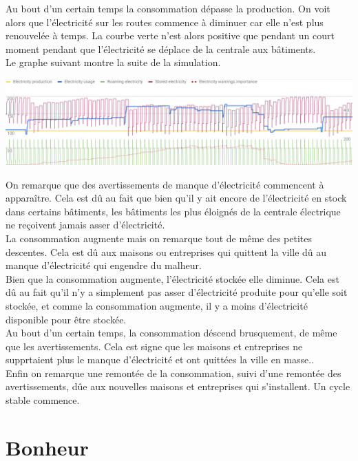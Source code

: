 \documentclass[11pt]{report}
\begin{document}
Au bout d'un certain temps la consommation dépasse la production. On voit alors que l'électricité sur les routes commence à diminuer car elle n'est plus renouvelée à temps. La courbe verte n'est alors positive que pendant un court moment pendant que l'électricité se déplace de la centrale aux bâtiments.\\
Le graphe suivant montre la suite de la simulation.
\begin{center}
	\includegraphics[width=\textwidth]{electricity_storage_2}
\end{center}
On remarque que des avertissements de manque d'électricité commencent à apparaître. Cela est dû au fait que bien qu'il y ait encore de l'électricité en stock dans certains bâtiments, les bâtiments les plus éloignés de la centrale électrique ne reçoivent jamais asser d'électricité.\\
La consommation augmente mais on remarque tout de même des petites descentes. Cela est dû aux maisons ou entreprises qui quittent la ville dû au manque d'électricité qui engendre du malheur.\\
Bien que la consommation augmente, l'électricité stockée elle diminue. Cela est dû au fait qu'il n'y a simplement pas asser d'électricité produite pour qu'elle soit stockée, et comme la consommation augmente, il y a moins d'électricité disponible pour être stockée.\\
Au bout d'un certain temps, la consommation déscend brusquement, de même que les avertissements. Cela est signe que les maisons et entreprises ne supprtaient plus le manque d'électricité et ont quittées la ville en masse..\\
Enfin on remarque une remontée de la consommation, suivi d'une remontée des avertissements, dûe aux nouvelles maisons et entreprises qui s'installent. Un cycle stable commence.


\section{Bonheur}
\end{document}

